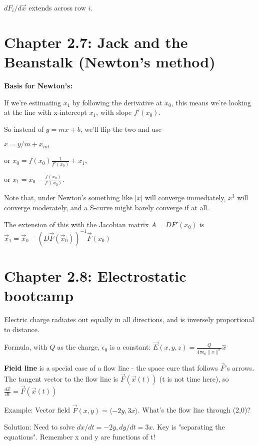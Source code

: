 \documentclass[11pt, oneside]{article}   	%
\begin{document}
$dF_i/d\overrightarrow{x}$ extends across row $i$.

\section{Chapter 2.7: Jack and the Beanstalk (Newton's method)}

\textbf{Basis for Newton's:}

If we're estimating $x_1$ by following the derivative at $x_0$, this means we're looking at the line with x-intercept $x_1$, with slope $f'(x_0)$.

  So instead of $y = mx+b$, we'll flip the two and use 
  
 $x = y/m + x_{int}$ 
 
or $x_0 = f(x_0)\frac{1}{f'(x_0)} + x_1$, 

or $x_1 = x_0 - \frac{f(x_0)}{f'(x_0)}$.

Note that, under Newton's something like $|x|$ will converge immediately, $x^3$ will converge moderately, and a S-curve might barely converge if at all.

The extension of this with the Jacobian matrix $A = DF'(x_0)$ is $\overrightarrow{x}_1 = \overrightarrow{x}_0 - (D\overrightarrow{F}(\overrightarrow{x}_0))^{-1}\overrightarrow{F}(x_0)$ 


\section{Chapter 2.8: Electrostatic bootcamp}

Electric charge radiates out equally in all directions, and is inversely proportional to distance.  

Formula, with $Q$ as the charge, $\epsilon_0$ is a constant: $\overrightarrow{E}(x,y,z) = \frac{Q}{4\pi\epsilon_0\|x\|^2}\hat{x}$

\textbf{Field line} is a special case of a {flow line} - the space cure that follows $\overrightarrow{F}$'s arrows.  The tangent vector to the flow line is $\overrightarrow{F}(\overrightarrow{x}(t))$ (t is not time here), so $\frac{d\overrightarrow{x}}{dt} = \overrightarrow{F}(\overrightarrow{x}(t))$

Example: Vector field $\overrightarrow{F}(x,y) = \langle -2y, 3x \rangle$.  What's the flow line through (2,0)?

Solution: Need to solve 
$dx/dt = -2y, dy/dt = 3x$.  Key is "separating the equations".  Remember x and y are functions of t!
\end{document}
